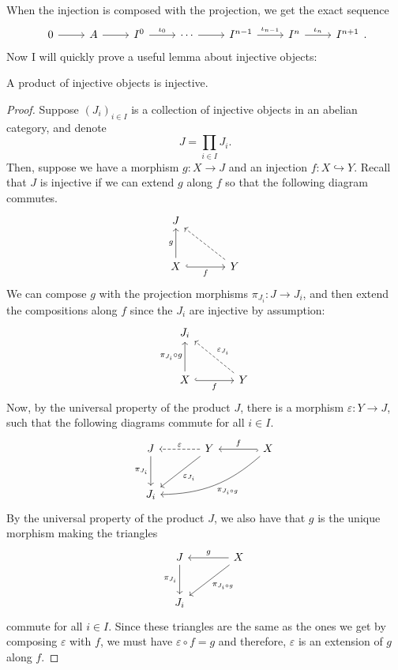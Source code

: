 When the injection is composed with the projection, we get the exact sequence
\[\begin{tikzcd}
    0\rar & A\rar & I^{0}\rar{\iota_{0}} & \cdots\rar
    & I^{n-1}\rar{\iota_{n-1}} & I^{n}\rar{\iota_{n}} & I^{n+1}
  \end{tikzcd}.\]
Now I will quickly prove a useful lemma about injective objects:
\begin{lemm}\label{lemm:product_injectives}
  A product of injective objects is injective.
\end{lemm}
\begin{proof}
  Suppose $(J_{i})_{i\in I}$ is a collection of injective objects in an
  abelian category, and denote
  \[
    J=\prod_{i\in I} J_{i}.
  \]
  Then, suppose we have a morphism $g: X\to J$ and an injection
  $f:X\hookrightarrow Y$. Recall that $J$ is injective if we can extend $g$
  along $f$ so that the following diagram commutes.
  \[\begin{tikzcd}[row sep=large, column sep=large]
      J & \\ X\uar{g}\arrow[r, hook, "f"'] & Y\ular[dashed]
    \end{tikzcd}\]
  We can compose $g$ with the projection morphisms
  $\pi_{J_{i}}:J\to J_{i}$, and then extend the compositions along $f$
  since the $J_{i}$ are injective by assumption:
  \[\begin{tikzcd}[row sep=large, column sep=large]
        J_{i} & \\ X\uar{\pi_{J_{i}}\circ g}\arrow[r, hook, "f"']
        & Y\arrow[ul, dashed, "\varepsilon_{J_{i}}"']
    \end{tikzcd}\]
  Now, by the universal property of the product $J$, there is a morphism
  $\varepsilon: Y\to J$, such that the following diagrams commute for all $i\in I$.
  \[\begin{tikzcd}[row sep=large, column sep=large]
      J\arrow[d, "\pi_{J_{i}}"'] & Y\arrow[l, dashed, "\varepsilon"']
      \dlar{\varepsilon_{J_{i}}} & X\arrow[l, hook, "f"']
      \arrow[dll, bend left=20, "\pi_{J_{i}\circ g}"] \\ J_{i} &&
    \end{tikzcd}\]
  By the universal property of the product $J$, we also have that $g$ is the
  unique morphism making the triangles
  \[\begin{tikzcd}[row sep = large, column sep=large]
      J\arrow[d, "\pi_{J_{i}}"'] & X\arrow[l, "g"']\dlar{\pi_{J_{i}\circ g}} \\
      J_{i} &
    \end{tikzcd}\]
  commute for all $i\in I$. Since these triangles are the same as the ones
  we get by composing $\varepsilon$ with $f$, we must have $\varepsilon\circ f=g$
  and therefore, $\varepsilon$ is an extension of $g$ along $f$.
\end{proof}
